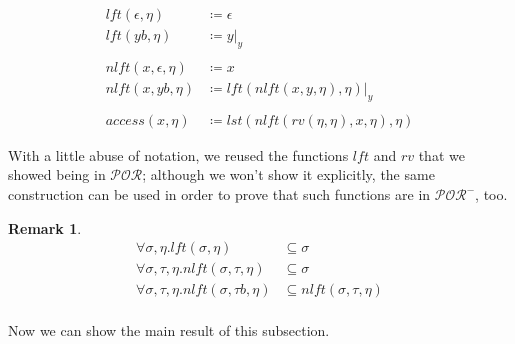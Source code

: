 \documentclass[10pt]{amsart}
\newcommand{\POR}{\mathcal{POR}}
\newcommand{\vone}{x}
\newcommand{\vtwo}{y}
\newcommand{\sone}{\sigma}
\newcommand{\stwo}{\tau}
\newcommand{\rv}{rv}
\newtheorem{remark}{Remark}
\begin{document}
\begin{align*}
lft(\epsilon, \eta) & \coloneqq \epsilon\\
lft(\vtwo b, \eta) & \coloneqq \vtwo|_\vtwo\\\\
nlft(\vone, \epsilon, \eta) & \coloneqq \vone \\
nlft(\vone, \vtwo b, \eta) & \coloneqq lft(nlft(\vone, \vtwo, \eta), \eta)|_\vtwo \\\\
access(\vone, \eta) &\coloneqq lst(nlft(\rv(\eta, \eta), \vone, \eta), \eta)
\end{align*}

With a little abuse of notation, we reused the functions $lft$ and $\rv$ that we showed being in $\POR$; although we won't show it explicitly, the same construction can be used in order to prove that such functions are in $\POR^-$, too.

\begin{remark}
\begin{align*}
\forall \sone, \eta. lft(\sone, \eta)&\subseteq \sone\\
\forall \sone, \stwo, \eta. nlft(\sone, \stwo, \eta)&\subseteq \sone\\
\forall \sone, \stwo, \eta. nlft(\sone, \stwo b, \eta)&\subseteq  nlft(\sone, \stwo, \eta)\\
\end{align*}
\end{remark}

Now we can show the main result of this subsection.
\end{document}
